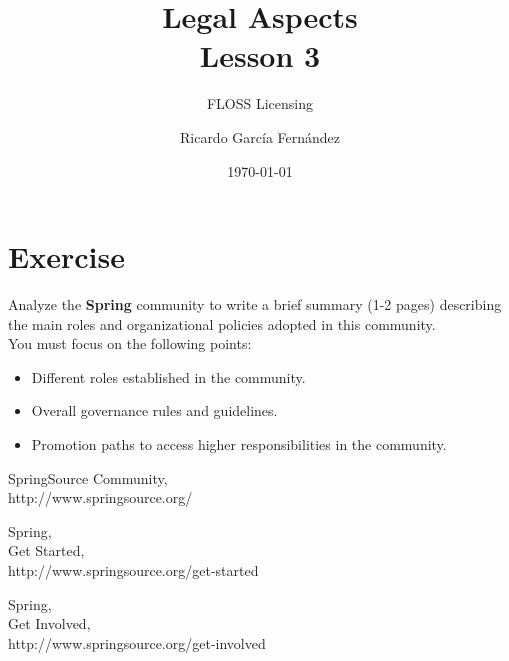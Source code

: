 \documentclass[11pt]{scrartcl}
\title{\textbf{Legal Aspects\\
				Lesson 3}}
\subtitle{FLOSS Licensing}
\author{Ricardo Garc\'ia Fern\'andez}
\date{\today}
\begin{document}
\maketitle

\section{Exercise}

Analyze the \textbf{Spring} community to write a brief summary (1-2 pages) describing the main roles and organizational policies adopted in this community.\\

You must focus on the following points:

\begin{itemize}

	\item Different roles established in the community.
	\item Overall governance rules and guidelines.
	\item Promotion paths to access higher responsibilities in the community.
\end{itemize}

\begin{thebibliography}{9}

  SpringSource Community,\\
  http://www.springsource.org/

  Spring,\\
  Get Started,\\
  http://www.springsource.org/get-started

  Spring,\\
  Get Involved,\\
  http://www.springsource.org/get-involved

\end{thebibliography}
\end{document}

